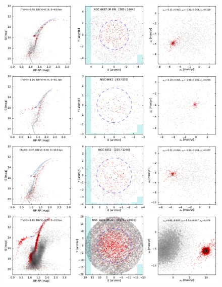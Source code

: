 \documentclass[usenatbib]{mnras}
\begin{document}
\clearpage\begin{figure}
\contcaption{}
\includegraphics{figs/NGC_6637_M_69.pdf}
\includegraphics{figs/NGC_6642.pdf}
\includegraphics{figs/NGC_6652.pdf}
\includegraphics{figs/NGC_6656_M_22.pdf}
\end{figure}
\end{document}
